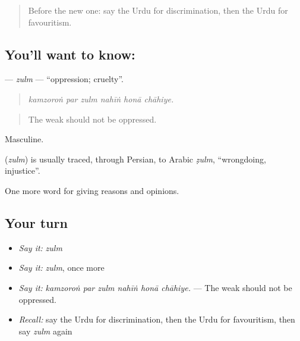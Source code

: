 \label{lesson:UR-C344-zulm}



\begin{quote}
Before the new one: say the Urdu for discrimination, then the Urdu for favouritism.
\end{quote}

\subsection*{You'll want to know: }
\textbf{} — \emph{zulm} — \textquotedblleft{}oppression; cruelty\textquotedblright{}.

\begin{quote}
     
\end{quote}

\begin{quote}
\emph{kamzoroṅ par zulm nahīṅ honā chāhiye.}
\end{quote}

\begin{quote}
The weak should not be oppressed.
\end{quote}

Masculine.

\begin{cousinweb}
\textbf{} (\emph{zulm}) is usually traced, through Persian, to Arabic \emph{ẓulm}, \textquotedblleft{}wrongdoing, injustice\textquotedblright{}.
\end{cousinweb}

\begin{grammarlens}[title={What you've built}]
One more word for giving reasons and opinions.
\end{grammarlens}

\subsection*{Your turn}
\begin{itemize}
\raggedright
  \item \emph{Say it:} \emph{zulm}
  \item \emph{Say it:} \emph{zulm}, once more
  \item \emph{Say it:} \emph{kamzoroṅ par zulm nahīṅ honā chāhiye.} — The weak should not be oppressed.
  \item \emph{Recall:} say the Urdu for discrimination, then the Urdu for favouritism, then say \emph{zulm} again
\end{itemize}

